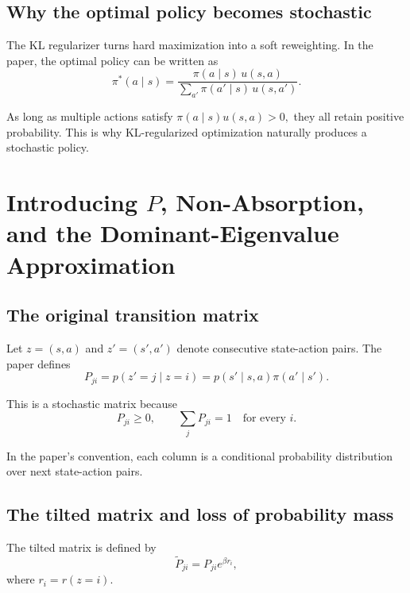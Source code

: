 \documentclass[11pt]{article}
\begin{document}
\subsection*{Why the optimal policy becomes stochastic}

The KL regularizer turns hard maximization into a soft reweighting. In the paper, the
optimal policy can be written as
\begin{equation}
    \pi^*(a\mid s)
    = \frac{\pi(a\mid s)\,u(s,a)}{\sum_{a'} \pi(a'\mid s)\,u(s,a')}.
\end{equation}

As long as multiple actions satisfy
\(
\pi(a\mid s)u(s,a)>0,
\)
they all retain positive probability. This is why KL-regularized optimization naturally
produces a stochastic policy.

\section{Introducing \texorpdfstring{$P$}{P}, Non-Absorption, and the Dominant-Eigenvalue Approximation}

\subsection*{The original transition matrix}

Let \(z=(s,a)\) and \(z'=(s',a')\) denote consecutive state-action pairs. The paper defines
\begin{equation}
    P_{ji}=p(z'=j\mid z=i)=p(s'\mid s,a)\pi(a'\mid s').
\end{equation}

This is a stochastic matrix because
\begin{equation}
    P_{ji}\ge 0,
    \qquad
    \sum_j P_{ji}=1
    \quad \text{for every } i.
\end{equation}

In the paper's convention, each column is a conditional probability distribution over next
state-action pairs.

\subsection*{The tilted matrix and loss of probability mass}

The tilted matrix is defined by
\begin{equation}
    \widetilde{P}_{ji} = P_{ji}e^{\beta r_i},
\end{equation}
where \(r_i=r(z=i)\).
\end{document}
